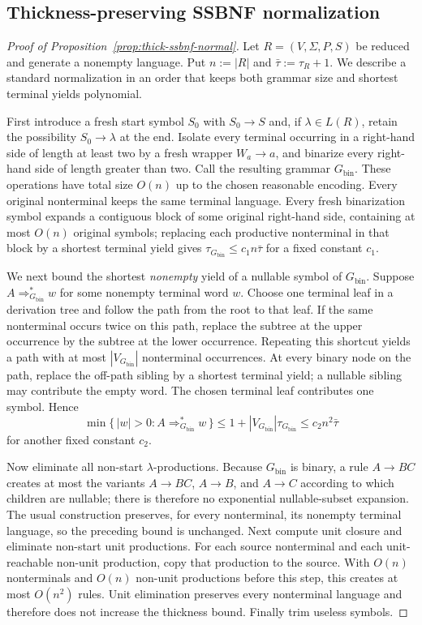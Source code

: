 \documentclass[11pt,a4paper]{article}
\theoremstyle{remark}
\theoremstyle{plain}
\begin{document}
\subsection{Thickness-preserving SSBNF normalization}
\label{app:thick-ssbnf}

\begin{proof}[Proof of Proposition~\ref{prop:thick-ssbnf-normal}]
Let $R=(V,\Sigma,P,S)$ be reduced and generate a nonempty language.  Put
$n:=|R|$ and $\bar\tau:=\tau_R+1$.  We describe a standard normalization in
an order that keeps both grammar size and shortest terminal yields polynomial.

First introduce a fresh start symbol $S_0$ with $S_0\to S$ and, if
$\lambda\in L(R)$, retain the possibility $S_0\to\lambda$ at the end.  Isolate every terminal occurring in a right-hand side of length at least two
by a fresh wrapper $W_a\to a$, and binarize every right-hand side of length
greater than two.
Call the resulting grammar $G_{\mathrm{bin}}$.  These operations have total size $O(n)$ up
to the chosen reasonable encoding.  Every original nonterminal keeps the same
terminal language.  Every fresh binarization symbol expands a contiguous block
of some original right-hand side, containing at most $O(n)$ original symbols;
replacing each productive nonterminal in that block by a shortest terminal
yield gives
$\tau_{G_{\mathrm{bin}}}\le c_1 n\bar\tau$
for a fixed constant $c_1$.

We next bound the shortest \emph{nonempty} yield of a nullable symbol of $G_{\mathrm{bin}}$.
Suppose $A\Rightarrow_{G_{\mathrm{bin}}}^*w$ for some nonempty terminal word $w$.  Choose one
terminal leaf in a derivation tree and follow the path from the root to that
leaf.  If the same nonterminal occurs twice on this path, replace the subtree
at the upper occurrence by the subtree at the lower occurrence.  Repeating
this shortcut yields a path with at most $|V_{G_{\mathrm{bin}}}|$ nonterminal occurrences.
At every binary node on the path, replace the off-path sibling by a shortest
terminal yield; a nullable sibling may contribute the empty word.  The chosen
terminal leaf contributes one symbol.  Hence
\[
 \min\{\,|w|>0:A\Rightarrow_{G_{\mathrm{bin}}}^*w\,\}
 \le 1+|V_{G_{\mathrm{bin}}}|\tau_{G_{\mathrm{bin}}}
 \le c_2 n^2\bar\tau
\]
for another fixed constant $c_2$.

Now eliminate all non-start $\lambda$-productions.  Because $G_{\mathrm{bin}}$ is binary, a
rule $A\to BC$ creates at most the variants $A\to BC$, $A\to B$, and
$A\to C$ according to which children are nullable; there is therefore no
exponential nullable-subset expansion.  The usual construction preserves, for
every nonterminal, its nonempty terminal language, so the preceding bound is
unchanged.  Next compute unit closure and eliminate non-start unit productions.
For each source nonterminal and each unit-reachable non-unit production, copy
that production to the source.  With $O(n)$ nonterminals and $O(n)$
non-unit productions before this step, this creates at most $O(n^2)$ rules.
Unit elimination preserves every nonterminal language and therefore does not
increase the thickness bound.  Finally trim useless symbols.


\end{proof}
\end{document}
